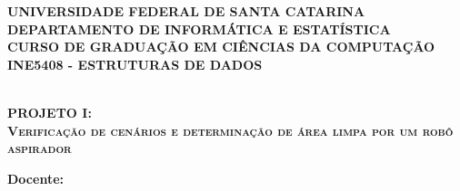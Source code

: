 \begin{center}

\textbf{UNIVERSIDADE FEDERAL DE SANTA CATARINA}\\[0.1cm] 
\textbf{DEPARTAMENTO DE INFORMÁTICA E ESTATÍSTICA}\\[0.1cm] 
\textbf{CURSO DE GRADUAÇÃO EM CIÊNCIAS DA COMPUTAÇÃO}\\[0.1cm] 
\textbf{INE5408 - ESTRUTURAS DE DADOS}\\[4cm]

\\ 
\vfill

\textsc{\large \bfseries PROJETO I: \\ Verificação de cenários e determinação de área limpa por um robô aspirador}\\[3cm] 
\end{center}

\noindent
\textbf{\large Docente:} \\[0.2cm]


\vfill
\begin{center}

\\ 
\\[1cm] 
    
\end{center}

\pagebreak
